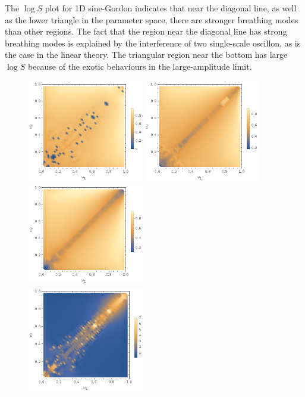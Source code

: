 \documentclass{report}
\begin{document}
The $\log S$ plot for 1D sine-Gordon indicates that near the diagonal line, as well as the lower triangle in the parameter space, there are stronger breathing modes than other regions. The fact that the region near the diagonal line has strong breathing modes is explained by the interference of two single-scale oscillon, as is the case in the linear theory. The triangular region near the bottom has large $\log S$ because of the exotic behaviours in the large-amplitude limit.

\begin{figure}[p]
  \begin{adjustwidth}{-1in}{-1in}
    \centering
    \includegraphics[width=0.45\textwidth]{plot/energy-ratio-axion-1d.png}
    \includegraphics[width=0.45\textwidth]{plot/energy-ratio-axion-2d.png}
    \includegraphics[width=0.45\textwidth]{plot/energy-ratio-axion-3d.png} \\
    \includegraphics[width=0.45\textwidth]{plot/r_max-axion-1d.png}

\end{adjustwidth}
\end{figure}
\end{document}
